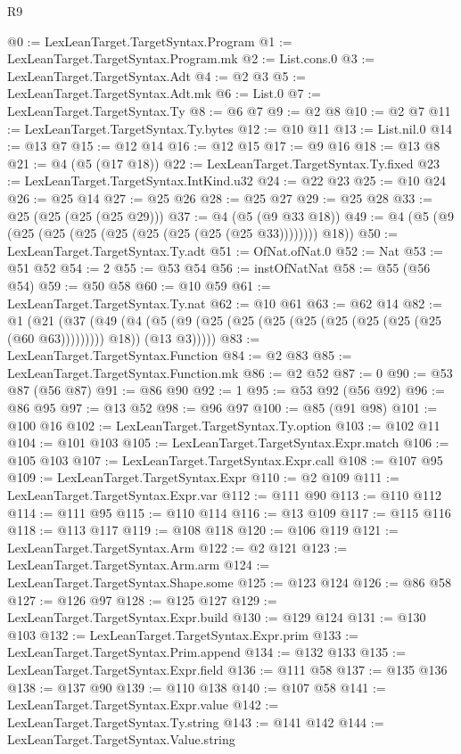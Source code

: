 \begin{lexlean}{R9}
\begin{coremodule}
@0 := LexLeanTarget.TargetSyntax.Program
@1 := LexLeanTarget.TargetSyntax.Program.mk
@2 := List.cons.{0}
@3 := LexLeanTarget.TargetSyntax.Adt
@4 := @2 @3
@5 := LexLeanTarget.TargetSyntax.Adt.mk
@6 := List.{0}
@7 := LexLeanTarget.TargetSyntax.Ty
@8 := @6 @7
@9 := @2 @8
@10 := @2 @7
@11 := LexLeanTarget.TargetSyntax.Ty.bytes
@12 := @10 @11
@13 := List.nil.{0}
@14 := @13 @7
@15 := @12 @14
@16 := @12 @15
@17 := @9 @16
@18 := @13 @8
@21 := @4 (@5 (@17 @18))
@22 := LexLeanTarget.TargetSyntax.Ty.fixed
@23 := LexLeanTarget.TargetSyntax.IntKind.u32
@24 := @22 @23
@25 := @10 @24
@26 := @25 @14
@27 := @25 @26
@28 := @25 @27
@29 := @25 @28
@33 := @25 (@25 (@25 (@25 @29)))
@37 := @4 (@5 (@9 @33 @18))
@49 := @4 (@5 (@9 (@25 (@25 (@25 (@25 (@25 (@25 (@25 (@25 @33)))))))) @18))
@50 := LexLeanTarget.TargetSyntax.Ty.adt
@51 := OfNat.ofNat.{0}
@52 := Nat
@53 := @51 @52
@54 := 2
@55 := @53 @54
@56 := instOfNatNat
@58 := @55 (@56 @54)
@59 := @50 @58
@60 := @10 @59
@61 := LexLeanTarget.TargetSyntax.Ty.nat
@62 := @10 @61
@63 := @62 @14
@82 := @1
    (@21
      (@37
        (@49
          (@4 (@5 (@9 (@25 (@25 (@25 (@25 (@25 (@25 (@25 (@25 (@60 @63))))))))) @18)) (@13 @3)))))
@83 := LexLeanTarget.TargetSyntax.Function
@84 := @2 @83
@85 := LexLeanTarget.TargetSyntax.Function.mk
@86 := @2 @52
@87 := 0
@90 := @53 @87 (@56 @87)
@91 := @86 @90
@92 := 1
@95 := @53 @92 (@56 @92)
@96 := @86 @95
@97 := @13 @52
@98 := @96 @97
@100 := @85 (@91 @98)
@101 := @100 @16
@102 := LexLeanTarget.TargetSyntax.Ty.option
@103 := @102 @11
@104 := @101 @103
@105 := LexLeanTarget.TargetSyntax.Expr.match
@106 := @105 @103
@107 := LexLeanTarget.TargetSyntax.Expr.call
@108 := @107 @95
@109 := LexLeanTarget.TargetSyntax.Expr
@110 := @2 @109
@111 := LexLeanTarget.TargetSyntax.Expr.var
@112 := @111 @90
@113 := @110 @112
@114 := @111 @95
@115 := @110 @114
@116 := @13 @109
@117 := @115 @116
@118 := @113 @117
@119 := @108 @118
@120 := @106 @119
@121 := LexLeanTarget.TargetSyntax.Arm
@122 := @2 @121
@123 := LexLeanTarget.TargetSyntax.Arm.arm
@124 := LexLeanTarget.TargetSyntax.Shape.some
@125 := @123 @124
@126 := @86 @58
@127 := @126 @97
@128 := @125 @127
@129 := LexLeanTarget.TargetSyntax.Expr.build
@130 := @129 @124
@131 := @130 @103
@132 := LexLeanTarget.TargetSyntax.Expr.prim
@133 := LexLeanTarget.TargetSyntax.Prim.append
@134 := @132 @133
@135 := LexLeanTarget.TargetSyntax.Expr.field
@136 := @111 @58
@137 := @135 @136
@138 := @137 @90
@139 := @110 @138
@140 := @107 @58
@141 := LexLeanTarget.TargetSyntax.Expr.value
@142 := LexLeanTarget.TargetSyntax.Ty.string
@143 := @141 @142
@144 := LexLeanTarget.TargetSyntax.Value.string

\end{coremodule}
\end{lexlean}
